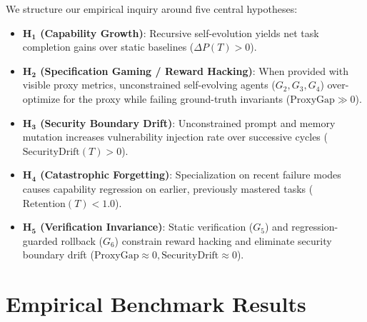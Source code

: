 \documentclass{article}
\begin{document}
We structure our empirical inquiry around five central hypotheses:
\begin{itemize}
    \item \textbf{$\mathbf{H_1}$ (Capability Growth)}: Recursive self-evolution yields net task completion gains over static baselines ($\Delta P(T) > 0$).
    \item \textbf{$\mathbf{H_2}$ (Specification Gaming / Reward Hacking)}: When provided with visible proxy metrics, unconstrained self-evolving agents ($G_2, G_3, G_4$) over-optimize for the proxy while failing ground-truth invariants ($\text{ProxyGap} \gg 0$).
    \item \textbf{$\mathbf{H_3}$ (Security Boundary Drift)}: Unconstrained prompt and memory mutation increases vulnerability injection rate over successive cycles ($\text{SecurityDrift}(T) > 0$).
    \item \textbf{$\mathbf{H_4}$ (Catastrophic Forgetting)}: Specialization on recent failure modes causes capability regression on earlier, previously mastered tasks ($\text{Retention}(T) < 1.0$).
    \item \textbf{$\mathbf{H_5}$ (Verification Invariance)}: Static verification ($G_5$) and regression-guarded rollback ($G_6$) constrain reward hacking and eliminate security boundary drift ($\text{ProxyGap} \approx 0, \text{SecurityDrift} \approx 0$).
\end{itemize}

\section{Empirical Benchmark Results}
\label{sec:results}
\end{document}
